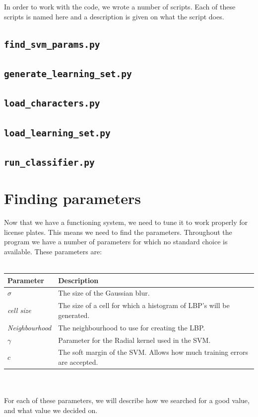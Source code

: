 \documentclass[a4paper]{article}
\begin{document}
In order to work with the code, we wrote a number of scripts. Each of these
scripts is named here and a description is given on what the script does.

\subsection*{\texttt{find\_svm\_params.py}}



\subsection*{\texttt{generate\_learning\_set.py}}



\subsection*{\texttt{load\_characters.py}}



\subsection*{\texttt{load\_learning\_set.py}}



\subsection*{\texttt{run\_classifier.py}}



\section{Finding parameters}

Now that we have a functioning system, we need to tune it to work properly for
license plates. This means we need to find the parameters. Throughout the
program we have a number of parameters for which no standard choice is
available. These parameters are:\\
\\
\begin{tabular}{l|l}
	Parameter 			& Description\\
	\hline
	$\sigma$  			& The size of the Gaussian blur.\\
	\emph{cell size}	& The size of a cell for which a histogram of LBP's
	                      will be generated.\\
	\emph{Neighbourhood}& The neighbourhood to use for creating the LBP.\\
	$\gamma$			& Parameter for the Radial kernel used in the SVM.\\
	$c$					& The soft margin of the SVM. Allows how much training
						  errors are accepted.\\
\end{tabular}\\
\\
For each of these parameters, we will describe how we searched for a good
value, and what value we decided on.
\end{document}

